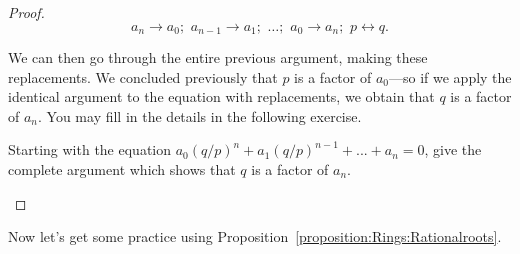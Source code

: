 \begin{proof}{}
$$ a_n  \rightarrow a_0;\,\, a_{n-1} \rightarrow a_1;\,\, \ldots;\,\, a_0 \rightarrow a_n; \,\,
p  \leftrightarrow q.$$

We can then go through the entire previous argument, making these replacements.   We concluded previously that $p$ is a factor of $a_0$---so if we apply the identical argument to the equation with replacements, we obtain that $q$ is a factor of $a_n$. You may fill in the details in the following exercise.

\begin{exercise}{}
Starting with the equation $a_{0}\left(q/p\right)^n+a_{1}\left(q/p\right)^{n-1}+...+a_{n}=0$, give the complete argument which shows that 
$q$ is a factor of $a_n$.
\end{exercise}

\end{proof}{}


Now let's get some practice using Proposition~\ref{proposition:Rings:Rationalroots}.

